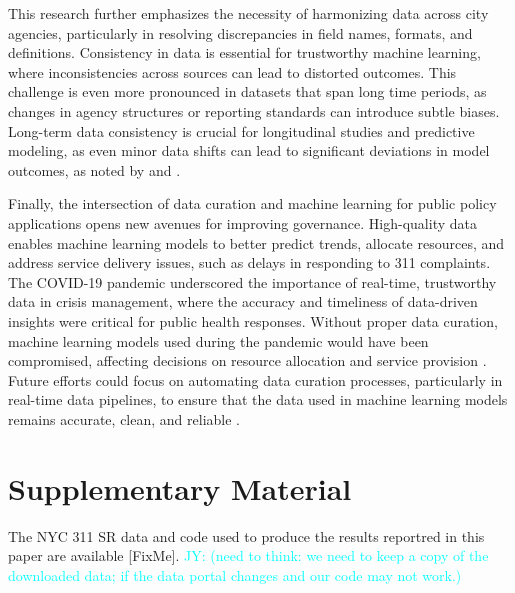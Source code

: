 \documentclass[linenumber]{jdsart}
\newcommand{\jy}[1]{\textcolor{cyan}{JY: (#1)}}
\begin{document}
This research further emphasizes the necessity of harmonizing data
across city agencies, particularly in resolving discrepancies in field
names, formats, and definitions. Consistency in data is essential for
trustworthy machine learning, where inconsistencies across sources can
lead to distorted outcomes. This challenge is even more pronounced in
datasets that span long time periods, as changes in agency structures
or reporting standards can introduce subtle biases. Long-term data
consistency is crucial for longitudinal studies and predictive
modeling, as even minor data shifts can lead to significant deviations
in model outcomes, as noted by \citet{rahm2000data} and
\citet{borgman2012conundrum}.


Finally, the intersection of data curation and machine learning for
public policy applications opens new avenues for improving governance.
High-quality data enables machine learning models to better predict
trends, allocate resources, and address service delivery issues, such
as delays in responding to 311 complaints. The COVID-19 pandemic
underscored the importance of real-time, trustworthy data in crisis
management, where the accuracy and timeliness of data-driven insights
were critical for public health responses. Without proper data
curation, machine learning models used during the pandemic would have
been compromised, affecting decisions on resource allocation and
service provision \citep{worby2020face, khemasuwan2021applications}.
Future efforts could focus on automating data curation processes,
particularly in real-time data pipelines, to ensure that the data used
in machine learning models remains accurate, clean, and reliable
\citep{chu2016data, hurbean2021open}.


\section*{Supplementary Material}
The NYC 311 SR data and code used to produce the results reportred in
this paper are available [FixMe].
\jy{need to think: we need to keep a copy of the downloaded data;
  if the data portal changes and our code may not work.}





\end{document}
